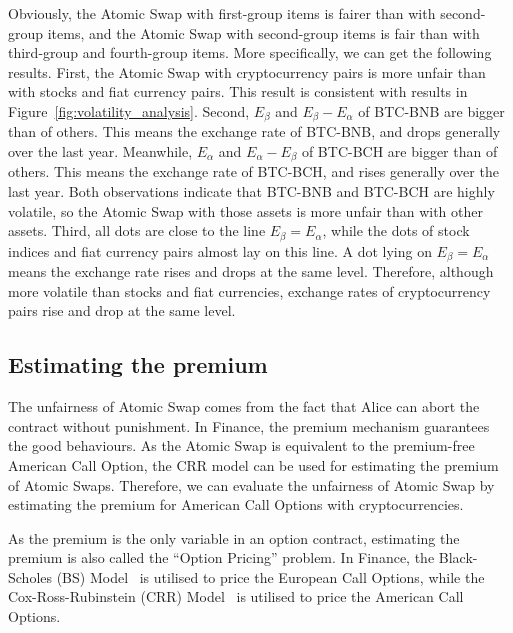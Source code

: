 Obviously, the Atomic Swap with first-group items is fairer than with second-group items, and the Atomic Swap with second-group items is fair than with third-group and fourth-group items.
More specifically, we can get the following results.
First, the Atomic Swap with cryptocurrency pairs is more unfair than with stocks and fiat currency pairs.
This result is consistent with results in Figure~\ref{fig:volatility_analysis}.
Second, $E_\beta$ and $E_\beta - E_\alpha$ of BTC-BNB are bigger than of others. This means the exchange rate of BTC-BNB, and drops generally over the last year.
Meanwhile, $E_\alpha$ and $E_\alpha - E_\beta$ of BTC-BCH are bigger than of others. This means the exchange rate of BTC-BCH, and rises generally over the last year.
Both observations indicate that BTC-BNB and BTC-BCH are highly volatile, so the Atomic Swap with those assets is more unfair than with other assets.
Third, all dots are close to the line $E_\beta = E_\alpha$, while the dots of stock indices and fiat currency pairs almost lay on this line.
A dot lying on $E_\beta = E_\alpha$ means the exchange rate rises and drops at the same level.
Therefore, although more volatile than stocks and fiat currencies, exchange rates of cryptocurrency pairs rise and drop at the same level.
















\subsection{Estimating the premium}

The unfairness of Atomic Swap comes from the fact that Alice can abort the contract without punishment.
In Finance, the premium mechanism guarantees the good behaviours.
As the Atomic Swap is equivalent to the premium-free American Call Option, the CRR model can be used for estimating the premium of Atomic Swaps.
Therefore, we can evaluate the unfairness of Atomic Swap by estimating the premium for American Call Options with cryptocurrencies.

As the premium is the only variable in an option contract, estimating the premium is also called the ``Option Pricing'' problem.
In Finance, the Black-Scholes (BS) Model~\cite{black1973pricing} is utilised to price the European Call Options,
while the Cox-Ross-Rubinstein (CRR) Model~\cite{cox1979option} is utilised to price the American Call Options.


